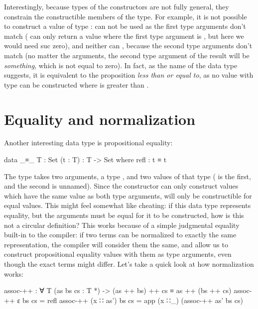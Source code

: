		Interestingly, because types of the constructors are not fully general,
		they constrain the constructible members of the type. For example, it
		is not possible to construct a value of type :
		 can not be used as the first type arguments don't match
		( can only return a value where the first type argument is
		, but here we would need suc zero), and neither can
		, because the second type arguments don't match (no matter
		the arguments, the second type argument of the result will be
		 \emph{something}, which is not equal to zero). In fact, as
		the name of the data type suggests, it is equivalent to the proposition
		\emph{less than or equal to}, as no value with type  can
		be constructed where  is greater than .
	
	\section{Equality and normalization}
	
		Another interesting data type is propositional equality:
	
		\begin{code}
			data _≡_ {T : Set} (t : T) : T -> Set where
			  refl : t ≡ t
		\end{code}
	
		The type  takes two arguments, a type , and two
		values of that type ( is the first, and the second is
		unnamed).  Since the constructor can only construct values which have
		the same value as both type arguments,  will only be
		constructible for equal values. This might feel somewhat like cheating:
		if this data type represents equality, but the arguments must be equal
		for it to be constructed, how is this not a circular definition? This
		works because of a simple judgmental equality built-in to the
		compiler: if two terms can be normalized to exactly the same
		representation, the compiler will consider them the same, and allow us
		to construct propositional equality values with them as type arguments,
		even though the exact terms might differ. Let's take a quick look at
		how normalization works:
	
		\begin{code}
			assoc-++ : ∀ {T} (as bs cs : T *) -> (as ++ bs) ++ cs ≡ as ++ (bs ++ cs)
			assoc-++ ε bs cs = refl
			assoc-++ (x ∷ as') bs cs = app (x ∷_) (assoc-++ as' bs cs)
		\end{code}
	

